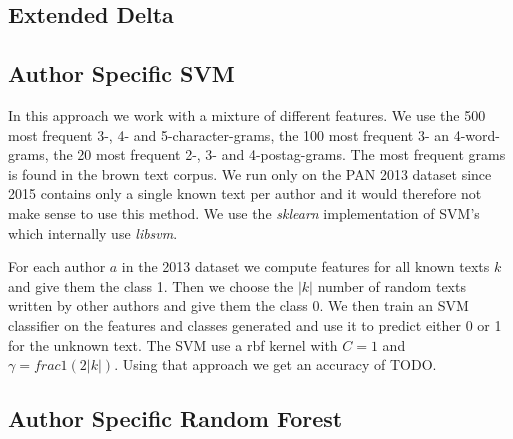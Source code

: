 \subsection{Extended Delta}

\subsection{Author Specific SVM}
In this approach we work with a mixture of different features. We use the 500
most frequent 3-, 4- and 5-character-grams, the 100 most frequent 3- an
4-word-grams, the 20 most frequent 2-, 3- and 4-postag-grams. The most frequent
grams is found in the brown text corpus. We run only on the PAN 2013 dataset
since 2015 contains only a single known text per author and it would therefore
not make sense to use this method. We use the \textit{sklearn} implementation of
\gls{SVM}'s which internally use \textit{libsvm}.

For each author $a$ in the 2013 dataset we compute features for all known texts
$k$ and give them the class 1. Then we choose the $|k|$ number of random texts
written by other authors and give them the class 0. We then train an \gls{SVM}
classifier on the features and classes generated and use it to predict either 0
or 1 for the unknown text. The \gls{SVM} use a rbf kernel with $C=1$ and
$\gamma = frac{1}{(2|k|)}$. Using that approach we get an accuracy of TODO.

\subsection{Author Specific Random Forest}
